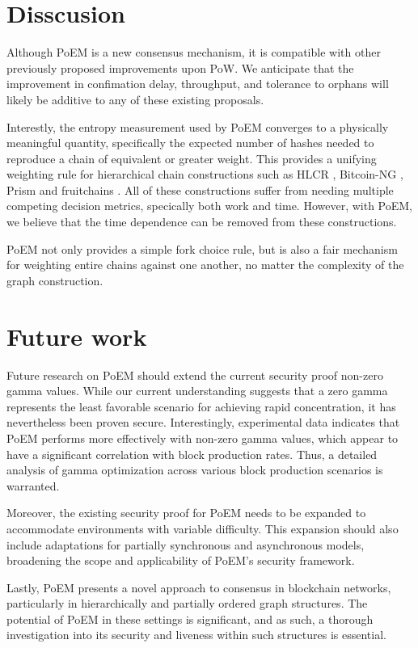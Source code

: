 \section{Disscusion}
Although PoEM is a new consensus mechanism, it is compatible with other
previously proposed improvements upon PoW. We anticipate that the improvement in confimation delay,
throughput, and tolerance to orphans will likely be additive to any of these
existing proposals. 

Interestly, the entropy measurement used by PoEM converges to a physically
meaningful quantity, specifically the expected number of hashes needed to
reproduce a chain of equivalent or greater weight.  This provides a unifying
weighting rule for hierarchical chain constructions such as HLCR \cite{hlcr},
Bitcoin-NG \cite{bitcoinng}, Prism \cite{prism} and fruitchains \cite{fruitchains}. All of these constructions suffer from
needing multiple competing decision metrics, specically both work and time.
However, with PoEM, we believe that the time dependence can be removed from
these constructions. 

PoEM not only provides a simple fork choice rule, but is also a fair mechanism
for weighting entire chains against one another, no matter the complexity of
the graph construction. 

\section{Future work} Future research on PoEM should extend the current
security proof non-zero gamma values. While our current understanding suggests
that a zero gamma represents the least favorable scenario for achieving rapid
concentration, it has nevertheless been proven secure. Interestingly,
experimental data indicates that PoEM performs more effectively with non-zero
gamma values, which appear to have a significant correlation with block
production rates. Thus, a detailed analysis of gamma optimization across
various block production scenarios is warranted.

Moreover, the existing security proof for PoEM needs to be expanded to
accommodate environments with variable difficulty. This expansion should also
include adaptations for partially synchronous and asynchronous models,
broadening the scope and applicability of PoEM's security framework.

Lastly, PoEM presents a novel approach to consensus in blockchain networks,
particularly in hierarchically and partially ordered graph structures. The
potential of PoEM in these settings is significant, and as such, a thorough
investigation into its security and liveness within such structures is
essential. 
